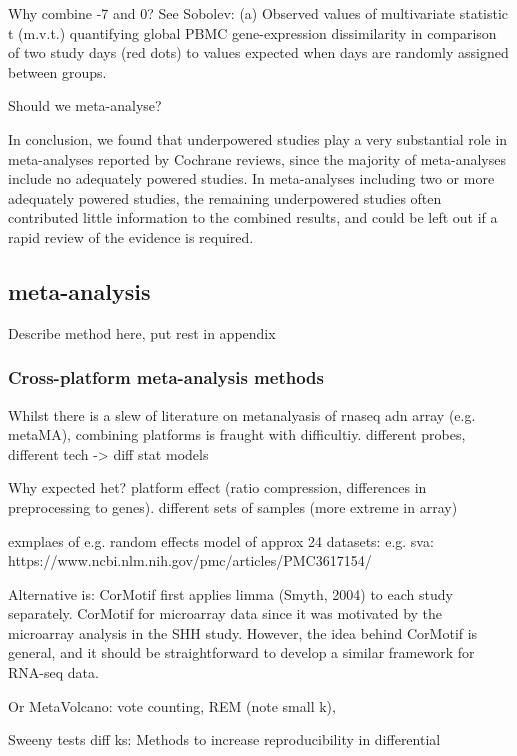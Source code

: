 Why combine -7 and 0? See Sobolev:
(a) Observed values of multivariate statistic t (m.v.t.) quantifying global PBMC gene-expression dissimilarity in comparison of two study days (red dots) to values expected when days are randomly assigned between groups.

Should we meta-analyse?

In conclusion, we found that underpowered studies play a very substantial role in meta-analyses reported by Cochrane reviews, since the majority of meta-analyses include no adequately powered studies. In meta-analyses including two or more adequately powered studies, the remaining underpowered studies often contributed little information to the combined results, and could be left out if a rapid review of the evidence is required.

\subsection{ meta-analysis}

Describe method here, put rest in appendix

\subsubsection{Cross-platform meta-analysis methods}

Whilst there is a slew of literature on metanalyasis of rnaseq adn array (e.g. metaMA), combining platforms is fraught with difficultiy.
different probes, 
different tech -> diff stat models

Why expected het?
platform effect (ratio compression, differences in preprocessing to genes). different sets of samples (more extreme in array)

exmplaes of 
e.g. random effects model of approx 24 datasets: 
e.g. sva: https://www.ncbi.nlm.nih.gov/pmc/articles/PMC3617154/

Alternative is: CorMotif first applies limma (Smyth, 2004) to each study separately.
CorMotif for microarray data since it was motivated by the microarray analysis in the SHH study. However, the idea behind CorMotif is general, and it should be straightforward to develop a similar framework for RNA-seq data.

Or MetaVolcano: vote counting, REM (note small k), 

Sweeny tests diff ks: Methods to increase reproducibility in differential

